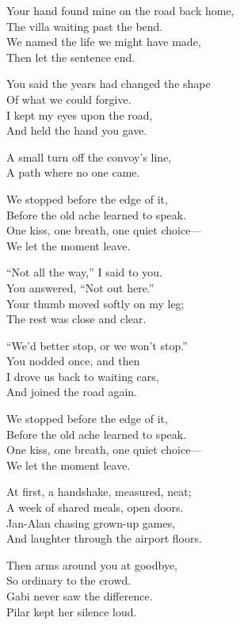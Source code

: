 \begin{lyrics}
Your hand found mine on the road back home,\\
The villa waiting past the bend.\\
We named the life we might have made,\\
Then let the sentence end.

You said the years had changed the shape\\
Of what we could forgive.\\
I kept my eyes upon the road,\\
And held the hand you gave.

A small turn off the convoy’s line,\\
A path where no one came.

We stopped before the edge of it,\\
Before the old ache learned to speak.\\
One kiss, one breath, one quiet choice—\\
We let the moment leave.

“Not all the way,” I said to you.\\
You answered, “Not out here.”\\
Your thumb moved softly on my leg;\\
The rest was close and clear.

“We’d better stop, or we won’t stop.”\\
You nodded once, and then\\
I drove us back to waiting cars,\\
And joined the road again.

We stopped before the edge of it,\\
Before the old ache learned to speak.\\
One kiss, one breath, one quiet choice—\\
We let the moment leave.

At first, a handshake, measured, neat;\\
A week of shared meals, open doors.\\
Jan-Alan chasing grown-up games,\\
And laughter through the airport floors.

Then arms around you at goodbye,\\
So ordinary to the crowd.\\
Gabi never saw the difference.\\
Pilar kept her silence loud.


\end{lyrics}
